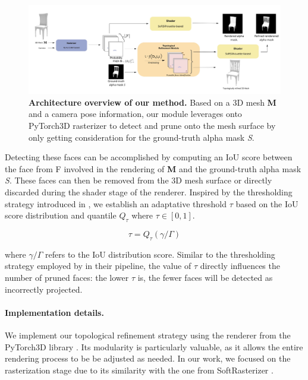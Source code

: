 \begin{figure}[htp!]
\begin{center}
\includegraphics[width=\linewidth]{images/adaptativesr/final_figure.jpg}
\end{center}
    \caption{\textbf{Architecture overview of our method.} Based on a 3D mesh \textbf{M} and a camera pose information, our module leverages onto PyTorch3D rasterizer to detect and prune onto the mesh surface by only getting consideration for the ground-truth alpha mask \textit{S}.}
\label{fig:pipeline_overview}
\end{figure}

Detecting these faces can be accomplished by computing an \ac{IoU} score between the face from F involved in the rendering of \textbf{M} and the ground-truth alpha mask \textit{S}. These faces can then be removed from the 3D mesh surface or directly discarded during the shader stage of the renderer. Inspired by the thresholding strategy introduced in \citep{pan2019deep}, we establish an adaptative threshold $\tau$ based on the \ac{IoU} score distribution and quantile $Q_{\tau}$ where $\tau \in [0,1]$.

\begin{equation}
    \tau=Q_{\tau}({\gamma/\Gamma})
\end{equation}

where ${\gamma/\Gamma}$ refers to the \ac{IoU} distribution score. Similar to the thresholding strategy employed by \citep{pan2019deep} in their pipeline, the value of $\tau$ directly influences the number of pruned faces: the lower $\tau$ is, the fewer faces will be detected as incorrectly projected.

\paragraph{Implementation details.}
We implement our topological refinement strategy using the renderer from the PyTorch3D library \citep{ravi2020accelarating}. Its modularity is particularly valuable, as it allows the entire rendering process to be  be adjusted as needed. In our work, we  focused on the rasterization stage due to its similarity with the one from SoftRasterizer \citep{liu2019soft}. 

